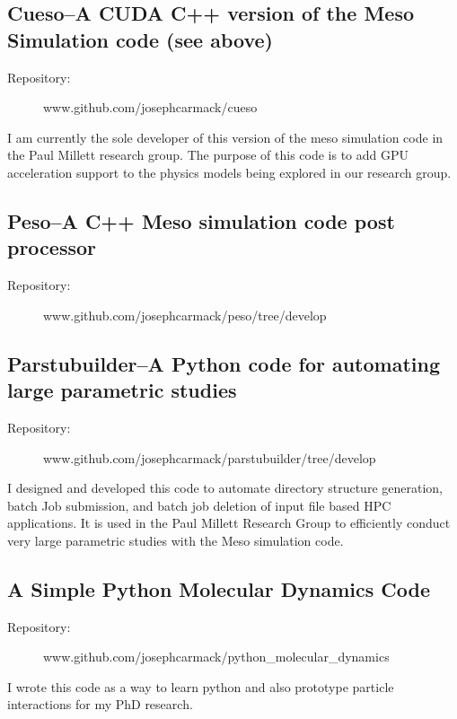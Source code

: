 \documentclass[10pt]{article}
\begin{document}
\subsection{Cueso--A CUDA C++ version of the Meso Simulation code (see above)}
\begin{description}
    \item[Repository:] www.github.com/josephcarmack/cueso
\end{description}
I am currently the sole developer of this version of the meso simulation code in
the Paul Millett research group. The purpose of this code is to add GPU acceleration
support to the physics models being explored in our research group.

\subsection{Peso--A C++ Meso simulation code post processor}
\begin{description}
    \item[Repository:] www.github.com/josephcarmack/peso/tree/develop
\end{description}

\subsection{Parstubuilder--A Python code for automating large parametric studies}
\begin{description}
    \item[Repository:] www.github.com/josephcarmack/parstubuilder/tree/develop
\end{description}
I designed and developed this code to automate directory structure generation,
batch Job submission, and batch job deletion of input file based HPC
applications. It is used in the Paul Millett Research Group to efficiently
conduct very large parametric studies with the Meso simulation code.

\subsection{A Simple Python Molecular Dynamics Code}
\begin{description}
    \item[Repository:] www.github.com/josephcarmack/python\_molecular\_dynamics
\end{description}
I wrote this code as a way to learn python and also prototype particle interactions
for my PhD research.
\end{document}
